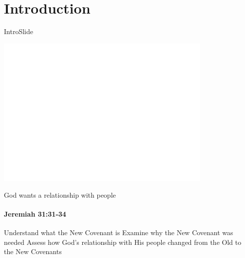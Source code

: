 
\section{Introduction}
\begin{frame}{IntroSlide}
\begin{center}
	\includegraphics[draft, width=0.8\textwidth]{figures/dummy.png}
\end{center}

\end{frame}

\begin{frame}{God wants a relationship with people}
\framesubtitle{Jeremiah 31:31-34}
	
\end{frame}

\begin{goals}
\goal Understand what the New Covenant is
\goal Examine why the New Covenant was needed
\goal Assess how God's relationship with His people changed from the Old to the New Covenants

\end{goals}

